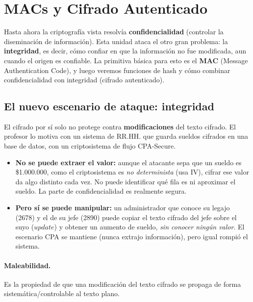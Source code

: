\documentclass[../main.tex]{subfiles}
\begin{document}
\section{MACs y Cifrado Autenticado}

Hasta ahora la criptografía vista resolvía \textbf{confidencialidad} (controlar la
diseminación de información). Esta unidad ataca el otro gran problema: la
\textbf{integridad}, es decir, cómo confiar en que la información no fue
modificada, aun cuando el origen es confiable. La primitiva básica para esto es
el \textbf{MAC} (Message Authentication Code), y luego veremos funciones de hash y
cómo combinar confidencialidad con integridad (cifrado autenticado).


\subsection{El nuevo escenario de ataque: integridad}

El cifrado por sí solo no protege contra \textbf{modificaciones} del texto cifrado.
El profesor lo motiva con un sistema de RR.HH. que guarda sueldos cifrados en una
base de datos, con un criptosistema de flujo CPA-Secure.

\begin{itemize}[leftmargin=1.4em]
  \item \textbf{No se puede extraer el valor:} aunque el atacante sepa que un sueldo
  es \$1.000.000, como el criptosistema es \emph{no determinista} (usa IV), cifrar
  ese valor da algo distinto cada vez. No puede identificar qué fila es ni aproximar
  el sueldo. La parte de confidencialidad es realmente segura.
  \item \textbf{Pero sí se puede manipular:} un administrador que conoce su legajo
  (2678) y el de su jefe (2890) puede copiar el texto cifrado del jefe sobre el suyo
  ($update$) y obtener un aumento de sueldo, \emph{sin conocer ningún valor}. El
  escenario CPA se mantiene (nunca extrajo información), pero igual rompió el
  sistema.
\end{itemize}

\paragraph{Maleabilidad.} Es la propiedad de que una modificación del texto cifrado
se propaga de forma sistemática/controlable al texto plano.
\end{document}
